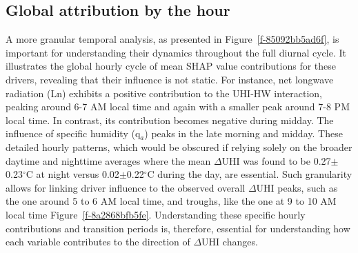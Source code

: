 \subsection*{Global attribution by the hour}
\bgroup
{}
\begin{figure*}[!htbp]
\centering \makeatletter{}
\makeatother 
\caption{{Global hourly cycle of mean SHAP value contributions. The y-axis represents the mean SHAP value contribution (\ensuremath{^\circ}C). Features' SHAP displayed as stacked bars. The solid black line indicates the total model prediction (sum of all mean SHAP contributions plus the base value), while the red dashed line shows the model's base value (0.186 \ensuremath{^\circ}C). Contributions from individual features (G, L\ensuremath{_{n}}, SH, K\ensuremath{_{n}}, q\ensuremath{_{a}}, AHac, \ensuremath{\Theta}\ensuremath{_{10cm}}, U10), as detailed in the legend, are plotted against local hour.}}
\label{f-85092bb5ad6f}
\end{figure*}
\egroup
A more granular temporal analysis, as presented in Figure~\ref{f-85092bb5ad6f}, is important for understanding their dynamics throughout the full diurnal cycle. It illustrates the global hourly cycle of mean SHAP value contributions for these drivers, revealing that their influence is not static. For instance, net longwave radiation (Ln\noindent ) exhibits a positive contribution to the UHI-HW interaction, peaking around 6-7 AM local time and again with a smaller peak around 7-8 PM local time. In contrast, its contribution becomes negative during midday. The influence of specific humidity (q\ensuremath{_{a}}) peaks in the late morning and midday. These detailed hourly patterns, which would be obscured if relying solely on the broader daytime and nighttime averages where the mean \ensuremath{\Delta }UHI was found to be 0.27\ensuremath{\pm}0.23\ensuremath{^\circ}C at night versus 0.02\ensuremath{\pm}0.22\ensuremath{^\circ}C during the day, are essential. Such granularity allows for linking driver influence to the observed overall \ensuremath{\Delta }UHI peaks, such as the one around 5 to 6 AM local time, and troughs, like the one at 9 to 10 AM local time Figure~\ref{f-8a2868bfb5fe}. Understanding these specific hourly contributions and transition periods is, therefore, essential for understanding how each variable contributes to the direction of \ensuremath{\Delta }UHI changes.

